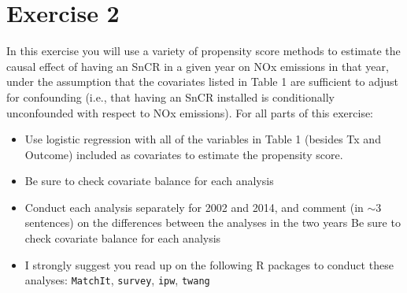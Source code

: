 
\section{Exercise 2}

\begin{quoting}
  In this exercise you will use a variety of propensity score methods
  to estimate the causal effect of having an SnCR in a given year on
  NOx emissions in that year, under the assumption that the covariates
  listed in Table 1 are sufficient to adjust for confounding (i.e.,
  that having an SnCR installed is conditionally unconfounded with
  respect to NOx emissions). For all parts of this exercise:
  \begin{itemize}
  \item Use logistic regression with all of the variables in Table 1
    (besides Tx and Outcome) included as covariates to estimate the
    propensity score.
  \item Be sure to check covariate balance for each analysis
  \item Conduct each analysis separately for 2002 and 2014, and
    comment (in $\sim$3 sentences) on the differences between the analyses
    in the two years Be sure to check covariate balance for each
    analysis
  \item I strongly suggest you read up on the following R packages to
    conduct these analyses: \texttt{MatchIt}, \texttt{survey},
    \texttt{ipw}, \texttt{twang}
  \end{itemize}
\end{quoting}


